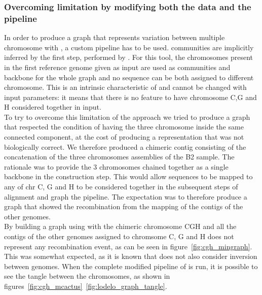 \subsubsection{Overcoming \mcactus limitation by modifying both the data and the pipeline}
In order to produce a graph that represents variation between multiple chromosome with \mcactus, a custom pipeline has to be used. \mcactus communities are implicitly inferred by the first step, performed by \minigraph. For this tool, the chromosomes present in the first reference genome given as input are used as communities and backbone for the whole graph and no sequence can be both assigned to different chromosome. This is an intrinsic characteristic of \minigraph and cannot be changed with input parameters: it means that there is no feature to have chromosome C,G and H considered together in input.\\
To try to overcome this limitation of the approach we tried to produce a graph that respected the condition of having the three chromosome inside the same connected component, at the cost of producing a representation that was not biologically correct. We therefore produced a chimeric contig consisting of the concatenation of the three chromosomes assemblies of the B2 sample. The rationale was to provide the 3 chromosomes chained together as a single backbone in the \minigraph construction step. This would allow sequences to be mapped to any of chr C, G and H to be considered together in the subsequent steps of alignment and graph the \mcactus pipeline. The expectation was to therefore produce a graph that showed the recombination from the mapping of the contigs of the other genomes. \\
By building a graph using \minigraph with the chimeric chromosome CGH and all the contigs of the other genomes assigned to chromsome C, G and H does not represent any recombination event, as can be seen in figure~\ref{fig:cgh_mingraph}. This was somewhat expected, as it is known that \minigraph does not also consider inversion between genomes.
When the complete modified pipeline of \mcactus is run, it is possible to see the tangle between the chromosomes, as shown in figures~\ref{fig:cgh_mcactus}~\ref{fig:lodelo_graph_tangle}.
